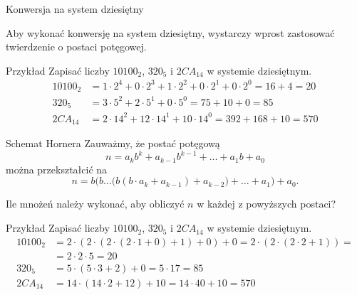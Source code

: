 \documentclass[a4paper,10pt]{beamer}
\begin{document}
\begin{frame}{Konwersja na system dziesiętny}
	
	Aby wykonać konwersję na system dziesiętny, wystarczy wprost zastosować twierdzenie o postaci potęgowej.
	
	\begin{exampleblock}{Przykład}
		Zapisać liczby $10100_2$, $320_5$ i $2CA_{14}$ w systemie dziesiętnym.		
	\begin{align*}
	10100_2&=1\cdot2^4+0\cdot2^3+1\cdot2^2+0\cdot2^1+0\cdot2^0=16+4=20\\
	320_5&=3\cdot5^2+2\cdot5^1+0\cdot5^0=75+10+0=85\\
	2CA_{14}&=2\cdot14^2+12\cdot14^1+10\cdot14^0=392+168+10=570
	\end{align*}
	\end{exampleblock}
	
\end{frame}


\begin{frame}
	
	\begin{block}{Schemat Hornera}
		Zauważmy, że postać potęgową
		$$n=a_kb^k+a_{k-1}b^{k-1}+\ldots+a_1b+a_0$$
		można przekształcić na
		$$n=b\Big(b\ldots\big(b(b\cdot a_k+a_{k-1})+a_{k-2}\big)+\ldots+a_1\Big)+a_0.$$
	\end{block}

	Ile mnożeń należy wykonać, aby obliczyć $n$ w każdej z powyższych postaci?
	
	\begin{exampleblock}{Przykład}
		Zapisać liczby $10100_2$, $320_5$ i $2CA_{14}$ w systemie dziesiętnym.		
		\begin{align*}
			10100_2&=2\cdot(2\cdot(2\cdot(2\cdot1+0)+1)+0)+0=2\cdot(2\cdot(2\cdot2+1))=\\
				   &=2\cdot2\cdot5=20\\
			320_5&=5\cdot(5\cdot3+2)+0=5\cdot17=85\\
			2CA_{14}&=14\cdot(14\cdot2+12)+10=14\cdot40+10=570
		\end{align*}
	\end{exampleblock}
	
\end{frame}
\end{document}
